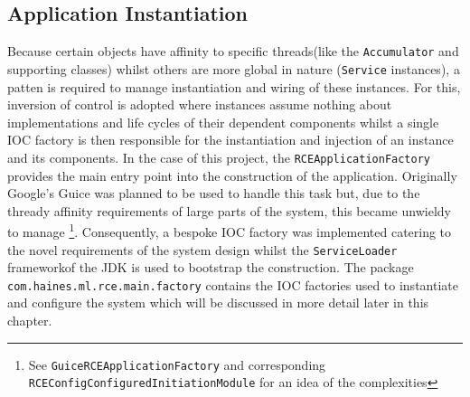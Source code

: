 \documentclass[a4paper,11pt]{scrreprt}
\begin{document}
\subsection{Application Instantiation}
Because certain objects have affinity to specific threads(like the \verb|Accumulator| and supporting classes) whilst others are more global in nature (\verb|Service| instances), a patten is required to manage instantiation and wiring of these instances. For this, inversion of control\cite{ioc} is adopted where instances assume nothing about implementations and life cycles of their dependent components whilst a single IOC factory is then responsible for the instantiation and injection of an instance and its components. In the case of this project, the \verb|RCEApplicationFactory| provides the main entry point into the construction of the application. Originally Google's Guice\cite{guice} was planned to be used to handle this task but, due to the thready affinity requirements of large parts of the system, this became unwieldy to manage \footnote{See \verb|GuiceRCEApplicationFactory| and corresponding \verb|RCEConfigConfiguredInitiationModule| for an idea of the complexities}. Consequently, a bespoke IOC factory was implemented catering to the novel requirements of the system design whilst the \verb|ServiceLoader| frameworkof the JDK is used to bootstrap the construction. The package \verb|com.haines.ml.rce.main.factory| contains the IOC factories used to instantiate and configure the system which will be discussed in more detail later in this chapter.
\end{document}
